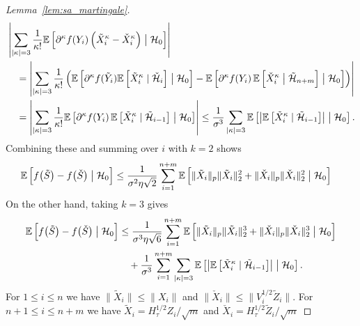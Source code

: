 \begin{proof}[Lemma~\ref{lem:sa_martingale}]
\begin{align*}
    &
    \left|
    \sum_{|\kappa| = 3}
    \frac{1}{\kappa!}
    \mathbb{E} \left[
      \partial^\kappa f(Y_i)
      \left( \tilde X_i^\kappa - \check X_i^\kappa \right)
      \bigm| \mathcal{H}_0
    \right]
    \right|
    \\
    &\quad=
    \left|
    \sum_{|\kappa| = 3}
    \frac{1}{\kappa!}
    \left(
      \mathbb{E} \left[
        \partial^\kappa f(\tilde Y_i)
        \mathbb{E} \left[ \tilde X_i^\kappa \mid \check {\mathcal{H}}_i \right]
        \bigm| \mathcal{H}_0
      \right]
      - \mathbb{E} \left[
        \partial^\kappa f(Y_i) \,
        \mathbb{E} \left[
          \check X_i^\kappa
          \bigm| \tilde {\mathcal{H}}_{n+m}
        \right]
        \bigm| \mathcal{H}_0
      \right]
    \right)
    \right|
    \\
    &\quad=
    \left|
    \sum_{|\kappa| = 3}
    \frac{1}{\kappa!}
    \mathbb{E} \left[
      \partial^\kappa f(Y_i) \,
      \mathbb{E} \left[ \tilde X_i^\kappa \mid \tilde {\mathcal{H}}_{i-1} \right]
      \bigm| \mathcal{H}_0
    \right]
    \right|
    \leq
    \frac{1}{\sigma^3}
    \sum_{|\kappa| = 3}
    \mathbb{E} \left[
      \left|
      \mathbb{E} \left[ \tilde X_i^\kappa \mid \tilde {\mathcal{H}}_{i-1} \right]
      \right|
      \bigm| \mathcal{H}_0
    \right].
  \end{align*}
  Combining these and summing over $i$ with $k=2$ shows
  \begin{align*}
    \mathbb{E}\left[
      f\big(\tilde S\big) - f\big(\check S\big)
      \bigm| \mathcal{H}_0
    \right]
    &\leq
    \frac{1}{\sigma^2 \eta \sqrt{2}}
    \sum_{i=1}^{n+m}
    \mathbb{E} \left[
      \|\tilde X_i\|_p \|\tilde X_i\|_2^2
      + \|\check X_i\|_p \|\check X_i\|_2^2
      \bigm| \mathcal{H}_0
    \right]
  \end{align*}
  On the other hand, taking $k = 3$ gives
  \begin{align*}
    \mathbb{E}\left[
      f\big(\tilde S\big) - f\big(\check S\big)
      \bigm| \mathcal{H}_0
    \right]
    &\leq
    \frac{1}{\sigma^3 \eta \sqrt{6}}
    \sum_{i=1}^{n+m}
    \mathbb{E} \left[
      \|\tilde X_i\|_p \|\tilde X_i\|_2^3
      + \|\check X_i\|_p \|\check X_i\|_2^3
      \bigm| \mathcal{H}_0
    \right] \\
    &\quad+
    \frac{1}{\sigma^3}
    \sum_{i=1}^{n+m}
    \sum_{|\kappa| = 3}
    \mathbb{E} \left[
      \left|
      \mathbb{E} \left[ \tilde X_i^\kappa \mid \tilde {\mathcal{H}}_{i-1} \right]
      \right|
      \bigm| \mathcal{H}_0
    \right].
  \end{align*}
  For $1 \leq i \leq n$ we have
  $\|\tilde X_i\| \leq \|X_i\|$
  and $\|\check X_i\| \leq \|V_i^{1/2} \tilde Z_i\|$.
  For $n+1 \leq i \leq n+m$ we have
  $\tilde X_i = H_\tau^{1/2} Z_i / \sqrt m$
  and $\check X_i = H_\tau^{1/2} \tilde Z_i / \sqrt m$

\end{proof}
